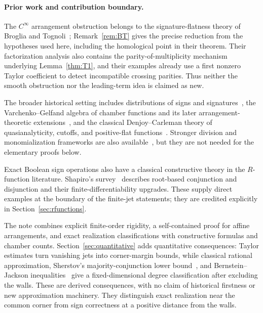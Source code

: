 \documentclass[11pt]{article}
\theoremstyle{definition}
\theoremstyle{remark}
\begin{document}
\paragraph{Prior work and contribution boundary.}
The $C^\infty$ arrangement obstruction belongs to the signature-flatness theory of Broglia and Tognoli~\cite{BrogliaTognoli1989}; Remark~\ref{rem:BT} gives the precise reduction from the hypotheses used here, including the homological point in their theorem. Their factorization analysis also contains the parity-of-multiplicity mechanism underlying Lemma~\ref{thm:T1}, and their examples already use a first nonzero Taylor coefficient to detect incompatible crossing parities. Thus neither the smooth obstruction nor the leading-term idea is claimed as new.

The broader historical setting includes distributions of signs and signatures~\cite{Fortuna1991,AcquistapaceBroglia1992,AcquistapaceBroglia1993Correction,AcquistapaceBrogliaFortuna1994,AcquistapaceBroglia1994}, the Varchenko--Gelfand algebra of chamber functions and its later arrangement-theoretic extensions~\cite{VarchenkoGelfand1987,Moseley2017,BjornerEtAl1999}, and the classical Denjoy--Carleman theory of quasianalyticity, cutoffs, and positive-flat functions~\cite{Rainer2022,Langenbruch2003,Thilliez2008}. Stronger division and monomialization frameworks are also available~\cite{BierstoneMilman2004,BelottoBierstoneChow2018,BelottoBierstone2023}, but they are not needed for the elementary proofs below.

Exact Boolean sign operations also have a classical constructive theory in the $R$-function literature. Shapiro's survey~\cite[Sections~3.3 and 3.6]{Shapiro2007} describes root-based conjunction and disjunction and their finite-differentiability upgrades. These supply direct examples at the boundary of the finite-jet statements; they are credited explicitly in Section~\ref{sec:rfunctions}.

The note combines explicit finite-order rigidity, a self-contained proof for affine arrangements, and exact realization classifications with constructive formulas and chamber counts. Section~\ref{sec:quantitative} adds quantitative consequences: Taylor estimates turn vanishing jets into corner-margin bounds, while classical rational approximation, Sherstov's majority-conjunction lower bound~\cite{Sherstov2013}, and Bernstein--Jackson inequalities~\cite{KopotunPrymakShevchuk2018} give a fixed-dimensional degree classification after excluding the walls. These are derived consequences, with no claim of historical firstness or new approximation machinery. They distinguish exact realization near the common corner from sign correctness at a positive distance from the walls.
\end{document}
